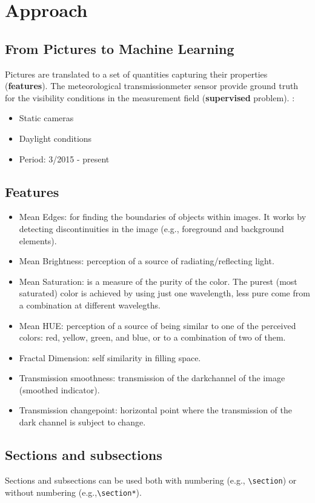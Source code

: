 \documentclass{article}
\begin{document}
\section*{Approach}
\subsection*{From Pictures to Machine Learning}
Pictures are translated to a set of quantities capturing their properties (\textbf{features}).\newline
The meteorological transmissionmeter sensor provide ground truth for the visibility conditions in the measurement field (\textbf{supervised} problem).
:
\begin{itemize}
\item Static cameras
\item Daylight conditions
\item Period: 3/2015 - present
\end{itemize}

\subsection*{Features}
\begin{itemize}
\item{Mean Edges: for finding the boundaries of objects within images. It works by detecting discontinuities in the image (e.g., foreground and background elements).}
\item{Mean Brightness: perception of a source of radiating/reflecting light.}
\item{Mean Saturation: is a measure of the purity of the color. The purest (most saturated) color is achieved by using just one wavelength, less pure come from a combination at different wavelegths.}
\item{Mean HUE: perception of a source of being similar to one of the perceived colors: red, yellow, green, and blue, or to a combination of two of them.}
\item{Fractal Dimension: self similarity in filling space.}
\item{Transmission smoothness: transmission of the darkchannel of the image (smoothed indicator).}
\item{Transmission changepoint: horizontal point where the transmission of the dark channel is subject to change.}
\end{itemize}


\subsection*{Sections and subsections}
Sections and subsections can be used both with numbering (e.g., \verb|\section|) or without numbering (e.g.,\verb|\section*|).
\end{document}
